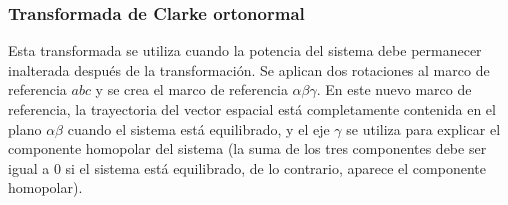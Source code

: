 \subsubsection{Transformada de Clarke ortonormal}

Esta transformada se utiliza cuando la potencia del sistema debe permanecer inalterada después de la transformación. Se aplican dos rotaciones al marco de referencia $abc$ y se crea el marco de referencia $\alpha\beta\gamma$. En este nuevo marco de referencia, la trayectoria del vector espacial está completamente contenida en el plano $\alpha\beta$ cuando el sistema está equilibrado, y el eje $\gamma$ se utiliza para explicar el componente homopolar del sistema (la suma de los tres componentes debe ser igual a 0 si el sistema está equilibrado, de lo contrario, aparece el componente homopolar).


